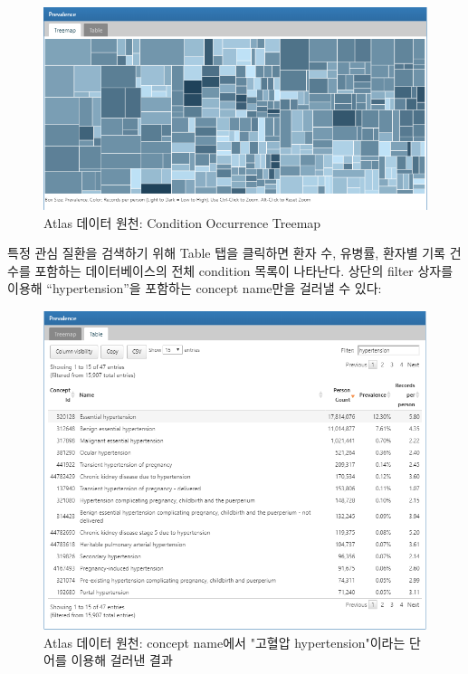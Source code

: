 \documentclass[10.5pt]{book}
\theoremstyle{definition}
\theoremstyle{definition}
\theoremstyle{definition}
\theoremstyle{remark}
\begin{document}
\begin{figure}

{\centering \includegraphics[width=1\linewidth]{images/Characterization/atlasDataSourcesConditionTreemap} 

}

\caption{Atlas 데이터 원천: Condition Occurrence Treemap}\label{fig:atlasDataSourcesConditionTreemap}
\end{figure}

특정 관심 질환을 검색하기 위해 Table 탭을 클릭하면 환자 수, 유병률,
환자별 기록 건수를 포함하는 데이터베이스의 전체 condition 목록이
나타난다. 상단의 filter 상자를 이용해 ``hypertension''을 포함하는
concept name만을 걸러낼 수 있다:

\begin{figure}

{\centering \includegraphics[width=1\linewidth]{images/Characterization/atlasDataSourcesConditionFiltered} 

}

\caption{Atlas 데이터 원천: concept name에서 "고혈압 hypertension"이라는 단어를 이용해 걸러낸 결과}\label{fig:atlasDataSourcesConditionFiltered}
\end{figure}
\end{document}
